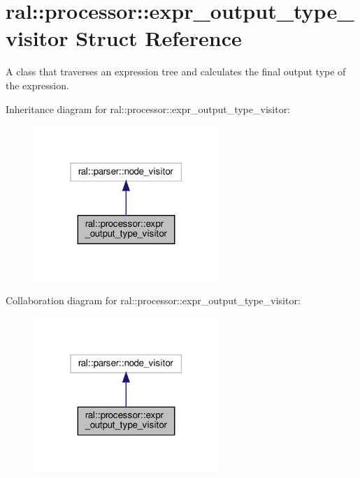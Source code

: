 \hypertarget{structral_1_1processor_1_1expr__output__type__visitor}{}\section{ral\+:\+:processor\+:\+:expr\+\_\+output\+\_\+type\+\_\+visitor Struct Reference}
\label{structral_1_1processor_1_1expr__output__type__visitor}


A class that traverses an expression tree and calculates the final output type of the expression.  




Inheritance diagram for ral\+:\+:processor\+:\+:expr\+\_\+output\+\_\+type\+\_\+visitor\+:\nopagebreak
\begin{figure}[H]
\begin{center}
\leavevmode
\includegraphics[width=199pt]{structral_1_1processor_1_1expr__output__type__visitor__inherit__graph}
\end{center}
\end{figure}


Collaboration diagram for ral\+:\+:processor\+:\+:expr\+\_\+output\+\_\+type\+\_\+visitor\+:\nopagebreak
\begin{figure}[H]
\begin{center}
\leavevmode
\includegraphics[width=199pt]{structral_1_1processor_1_1expr__output__type__visitor__coll__graph}
\end{center}
\end{figure}
